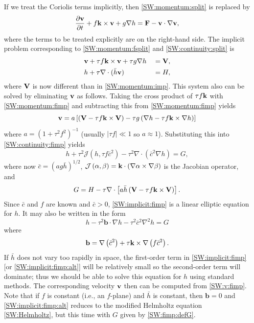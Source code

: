 \documentclass[12pt]{article}
\newcommand{\href}{\bar{h}}
\newcommand{\cbar}{\bar{c}}
\renewcommand{\b}{\mathbf{b}}
\newcommand{\cross}{\times}
\newcommand{\del}{\nabla}
\newcommand{\laplacian}[1]{\del^2#1}
\newcommand{\jacobian}[2]{\mathcal{J}\left(#1,#2\right)}
\begin{document}
If we treat the Coriolis terms implicitly, then \eqref{SW:momentum:split} is
replaced by
\begin{equation}
  \frac{\partial \vecv}{\partial t} + f\veck\cross\vecv + g\del h
    = \Fmom - \vecv\cdot\del\vecv ,
\label{SW:momentum:fsplit}
\end{equation}
where the terms to be treated explicitly are on the right-hand side.  The 
implicit problem corresponding to \eqref{SW:momentum:fsplit} and
\eqref{SW:continuity:split} is
\begin{alignat}{2}
  &\vecv + \tau f\veck\cross\vecv + \tau g\del h &&= \vecV ,
\label{SW:momentum:fimp}
\\
  &h + \tau \del\cdot(\href\vecv) &&= H ,
\label{SW:continuity:fimp}
\end{alignat}
where $\mathbf{V}$ is now different than in \eqref{SW:momentum:imp}.
This system also can be solved by eliminating $\mathbf{v}$ as follows.  
Taking the cross product of $\tau f\mathbf{k}$ with \eqref{SW:momentum:fimp}
and subtracting this from \eqref{SW:momentum:fimp} yields
\begin{equation}
 \vecv = a\left[\left(\vecV - \tau f\veck\cross\vecV\right)
           - \tau g\left(\del h - \tau f\veck\cross\del h\right)\right]
\label{SW:v:fimp}
\end{equation}
where $a = \left(1 + \tau^2 f^2\right)^{-1}$ (usually
$|\tau f|\ll1$ so $a\approx1$).  Substituting this into
\eqref{SW:continuity:fimp} yields
\begin{equation}
   h + \tau^2\jacobian{h}{\tau f\cbar^2} 
     - \tau^2\del\cdot\left(\cbar^2\del h\right) = G ,
\label{SW:implicit:fimp}
\end{equation}
where now $\cbar = \left(ag\href\right)^{1/2}$,
$\jacobian{\alpha}{\beta}=\veck\cdot(\del\alpha\cross\del\beta)$ is the
Jacobian operator, and \begin{equation}
   G = H - \tau \del\cdot\left[a\href
      \left(\vecV - \tau f\veck\cross\vecV\right)\right] .
\label{SW:fimp:defG}
\end{equation}
Since $\cbar$ and $f$ are known and $\cbar>0$, \eqref{SW:implicit:fimp} is a
linear elliptic equation for $h$.  It may also be written in the form
\begin{equation}
   h - \tau^2\b\cdot\del h - \tau^2\cbar^2\laplacian{h} = G 
\label{SW:implicit:fimp:alt}
\end{equation}
where
\begin{equation}
   \b = \del\left(\cbar^2\right) 
      + \tau\veck\cross\del\left(f\cbar^2\right) .
\end{equation}
If $\href$ does not vary too rapidly in space, the first-order term in
\eqref{SW:implicit:fimp} [or \eqref{SW:implicit:fimp:alt}] will be relatively
small so the second-order term will dominate; thus we should be able to solve
this equation for $h$ using standard methods.  The corresponding velocity
$\mathbf{v}$ then can be computed from \eqref{SW:v:fimp}.
Note that if $f$ is constant (i.e., an $f$-plane) and $\href$ is constant,
then $\b=0$ and \eqref{SW:implicit:fimp:alt} reduces to the modified 
Helmholtz equation \eqref{SW:Helmholtz}, but this time with $G$ given by 
\eqref{SW:fimp:defG}.
\end{document}
